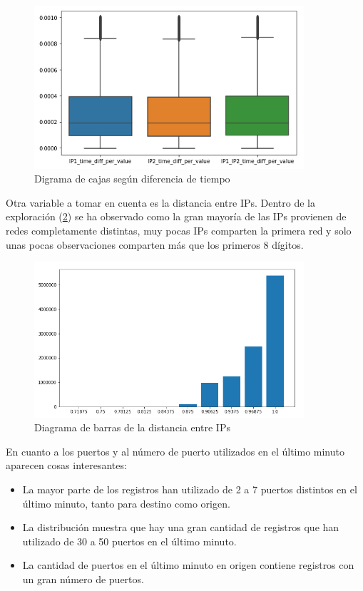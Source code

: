 \begin{figure}[h]
    \centering
    \includegraphics[width=10cm]{figs/ipdiff_comp.PNG}
    \caption{Digrama de cajas según diferencia de tiempo}
    \label{fig:ipdiff_comp}
\end{figure}

Otra variable a tomar en cuenta es la distancia entre IPs. Dentro de la exploración (\ref{fig:ipdist}) se ha observado como la gran mayoría de las IPs provienen de redes completamente distintas, muy pocas IPs comparten la primera red y solo unas pocas observaciones comparten más que los primeros 8 dígitos.

\begin{figure}[H]
    \centering
    \includegraphics[width=10cm]{figs/ip_distance.PNG}
    \caption{Diagrama de barras de la distancia entre IPs}
    \label{fig:ipdist}
\end{figure}

En cuanto a los puertos y al número de puerto utilizados en el último minuto aparecen cosas interesantes:

\begin{itemize}
    \item La mayor parte de los registros han utilizado de 2 a 7 puertos distintos en el último minuto, tanto para destino como origen.
    \item La distribución muestra que hay una gran cantidad de registros que han utilizado de 30 a 50 puertos en el último minuto.
    \item La cantidad de puertos en el último minuto en origen contiene registros con un gran número de puertos.
\end{itemize}

